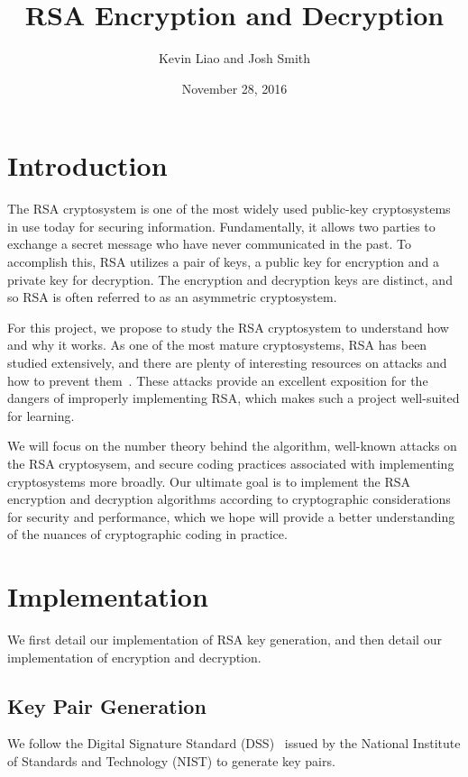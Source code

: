 \documentclass[a4paper]{article}
\title{RSA Encryption and Decryption}
\author{Kevin Liao and Josh Smith}
\date{November 28, 2016}
\begin{document}
\maketitle

\section{Introduction}
The RSA cryptosystem is one of the most widely used public-key cryptosystems in use today for securing information. Fundamentally, it allows two parties to exchange a secret message who have never communicated in the past. To accomplish this, RSA utilizes a pair of keys, a public key for encryption and a private key for decryption. The encryption and decryption keys are distinct, and so RSA is often referred to as an asymmetric cryptosystem.

For this project, we propose to study the RSA cryptosystem to understand how and why it works. As one of the most mature cryptosystems, RSA has been studied extensively, and there are plenty of interesting resources on attacks and how to prevent them~\cite{boneh1999twenty}. These attacks provide an excellent exposition for the dangers of improperly implementing RSA, which makes such a project well-suited for learning.

We will focus on the number theory behind the algorithm, well-known attacks on the RSA cryptosysem, and secure coding practices associated with implementing cryptosystems more broadly. Our ultimate goal is to implement the RSA encryption and decryption algorithms according to cryptographic considerations for security and performance, which we hope will provide a better understanding of the nuances of cryptographic coding in practice.

\section{Implementation}

We first detail our implementation of RSA key generation, and then detail our implementation of encryption and decryption.

\subsection{Key Pair Generation}

We follow the Digital Signature Standard (DSS)~\cite{fips2013186} issued by the National Institute of Standards and Technology (NIST) to generate key pairs.
\end{document}
